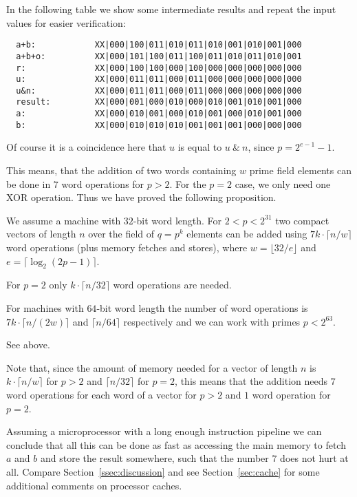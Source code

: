 In the following table we show some intermediate results and repeat
the input values for easier verification:

\begin{verbatim}
  a+b:            XX|000|100|011|010|011|010|001|010|001|000
  a+b+o:          XX|000|101|100|011|100|011|010|011|010|001
  r:              XX|000|100|100|000|100|000|000|000|000|000
  u:              XX|000|011|011|000|011|000|000|000|000|000
  u&n:            XX|000|011|011|000|011|000|000|000|000|000
  result:         XX|000|001|000|010|000|010|001|010|001|000
  a:              XX|000|010|001|000|010|001|000|010|001|000
  b:              XX|000|010|010|010|001|001|001|000|000|000
\end{verbatim}

Of course it is a coincidence here that $u$ is equal to 
$u \ \&\ n$, since $p = 2^{e-1}-1$.

This means, that the addition of two words containing $w$ prime field
elements can be done in $7$ word operations for $p > 2$. For the
$p=2$ case, we only need one XOR operation. Thus we have proved the
following proposition.

\begin{Prop}
\label{addvec}
We assume a machine with $32$-bit word length. For $2 < p < 2^{31}$
two compact vectors of length $n$ over the field of $q=p^k$
elements can be added using $7k\cdot \lceil n/w \rceil$ word operations
(plus memory fetches and stores), where $w = \lfloor 32/e \rfloor$
and $e = \lceil \log_2(2p-1) \rceil$. 

For $p=2$ only $k \cdot \lceil n/32 \rceil$ word operations are needed.

For machines with $64$-bit word length the number of word operations
is $7k \cdot \lceil n/(2w) \rceil$ and $\lceil n/64 \rceil$ respectively and 
we can work with primes $p < 2^{63}$.
\end{Prop}
\Proof See above. \ProofEnd

\begin{Rem}
Note that, since the amount of memory needed for a vector of length $n$
is $k \cdot \lceil n/w \rceil$ for $p > 2$ and $\lceil n/32 \rceil$ for
$p=2$, this means that the addition needs $7$ word operations for each
word of a vector for $p>2$ and $1$ word operation for $p=2$.

Assuming a microprocessor
with a long enough instruction pipeline we can conclude that all this
can be done as fast as accessing the main memory to fetch $a$ and $b$ and
store the result somewhere, such that the number $7$ does not hurt at all. 
Compare Section~\ref{ssec:discussion} and see Section~\ref{sec:cache}
for some additional comments on processor caches.
\end{Rem}

